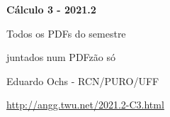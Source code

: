\documentclass[oneside,12pt]{article}
\begin{document}

\def\u#1{\par{\footnotesize \url{#1}}}

\def\drafturl{http://angg.twu.net/LATEX/2021-2-C3.pdf}
\def\drafturl{http://angg.twu.net/2021.2-C3.html}
\def\draftfooter{\tiny \href{\drafturl}{\jobname{}} \ColorBrown{\shorttoday{} \hours}}



%

\thispagestyle{empty}

\begin{center}

\vspace*{1.2cm}

{\bf \Large Cálculo 3 - 2021.2}

\bsk

Todos os PDFs do semestre

juntados num PDFzão só

\bsk

Eduardo Ochs - RCN/PURO/UFF

\url{http://angg.twu.net/2021.2-C3.html}

\end{center}

\newpage

\def\incl#1{}


\incl{2021-2-C3-intro}

\incl{2021-2-C3-vetor-tangente}

\incl{2021-2-C3-bezier}

\incl{2021-2-C3-MT1}
\end{document}
